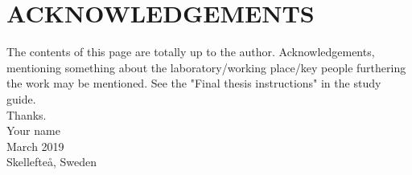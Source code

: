 \section*{ACKNOWLEDGEMENTS}

The contents of this page are totally up to the author. Acknowledgements, mentioning
something about the laboratory/working place/key people furthering the work may be
mentioned. See the "Final thesis instructions" in the study guide.\\

Thanks.\\

Your name\\
March 2019\\
Skellefte\r{a}, Sweden\\
